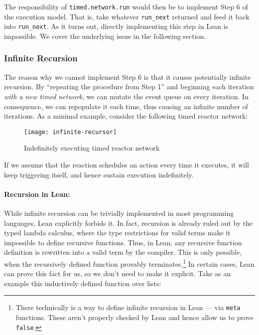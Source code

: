 \noindent The responsibility of \lstinline{timed.network.run} would then be to implement Step 6 of the execution model.
That is, take whatever \lstinline{run_next} returned and feed it back into \lstinline{run_next}.
As it turns out, directly implementing this step in Lean is impossible. 
We cover the underlying issue in the following section. 

\subsubsection{Infinite Recursion}
\label{section:recursion}

The reason why we cannot implement Step 6 is that it causes potentially infinite recursion.
By ``repeating the procedure from Step 1'' and beginning each iteration \emph{with a new timed network}, we can mutate the event queue on every iteration.
In consequence, we can repopulate it each time, thus causing an infinite number of iterations.
As a minimal example, consider the following timed reactor network:


\begin{figure}[h]
\centering
\texttt{[image: infinite-recursor]}
\caption{Indefinitely executing timed reactor network}
\end{figure}

\noindent If we assume that the reaction schedules an action every time it executes, it will keep triggering itself, and hence sustain execution indefinitely.

\paragraph{Recursion in Lean:}

While infinite recursion can be trivially implemented in most programming languages, Lean explicitly forbids it.
In fact, recursion is already ruled out by the typed lambda calculus, where the type restrictions for valid terms make it impossible to define recursive functions.
Thus, in Lean, any recursive function definition is rewritten into a valid term by the compiler. 
This is only possible, when the recursively defined function provably terminates.\footnote{
  There technically is a way to define infinite recursion in Lean --- via \verb|meta| functions. 
  These aren't properly checked by Lean and hence allow us to prove \verb|false|.
}
In certain cases, Lean can prove this fact for us, so we don't need to make it explicit.
Take as an example this inductively defined function over lists:

